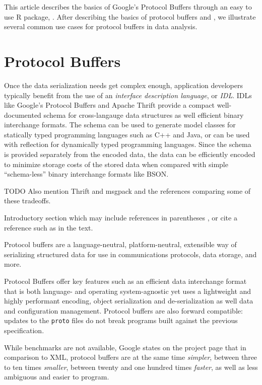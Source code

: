 This article describes the basics of Google's Protocol Buffers through
an easy to use R package, .  After describing the
basics of protocol buffers and , we illustrate
several common use cases for protocol buffers in data analysis.

\section{Protocol Buffers}

Once the data serialization needs get complex enough, application
developers typically benefit from the use of an \emph{interface
description language}, or \emph{IDL}.  IDLs like Google's Protocol
Buffers and Apache Thrift provide a compact well-documented schema for
cross-langauge data structures as well efficient binary interchange
formats.  The schema can be used to generate model classes for
statically typed programming languages such as C++ and Java, or can be
used with reflection for dynamically typed programming languages.
Since the schema is provided separately from the encoded data, the
data can be efficiently encoded to minimize storage costs of the
stored data when compared with simple ``schema-less'' binary
interchange formats like BSON.



TODO Also mention Thrift and msgpack and the references comparing some
of these tradeoffs.

Introductory section which may include references in parentheses
\citep{R}, or cite a reference such as \citet{R} in the text.

Protocol buffers are a language-neutral, platform-neutral, extensible
way of serializing structured data for use in communications
protocols, data storage, and more.

Protocol Buffers offer key features such as an efficient data interchange
format that is both language- and operating system-agnostic yet uses a
lightweight and highly performant encoding, object serialization and
de-serialization as well data and configuration management. Protocol
buffers are also forward compatible: updates to the \texttt{proto}
files do not break programs built against the previous specification.

While benchmarks are not available, Google states on the project page that in
comparison to XML, protocol buffers are at the same time \textsl{simpler},
between three to ten times \textsl{smaller}, between twenty and one hundred
times \textsl{faster}, as well as less ambiguous and easier to program.

